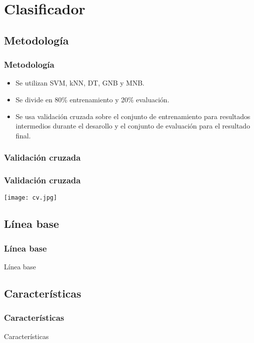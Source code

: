 \section{Clasificador}

\subsection{Metodología}
\begin{frame}
    \frametitle{Metodología}

    \begin{itemize}
        \item Se utilizan SVM, kNN, DT, GNB y MNB.
        \item Se divide en 80\% entrenamiento y 20\% evaluación.
        \item Se usa validación cruzada sobre el conjunto de entrenamiento para resultados intermedios durante el desarollo y el conjunto de evaluación para el resultado final.
    \end{itemize}
\end{frame}

\subsubsection{Validación cruzada}
\begin{frame}
    \frametitle{Validación cruzada}
    
    \begin{center}
        \texttt{[image: cv.jpg]}
    \end{center}
\end{frame}


\subsection{Línea base}
\begin{frame}
    \frametitle{Línea base}

    Línea base
\end{frame}

\subsection{Características}
\begin{frame}
    \frametitle{Características}

    Características
\end{frame}

